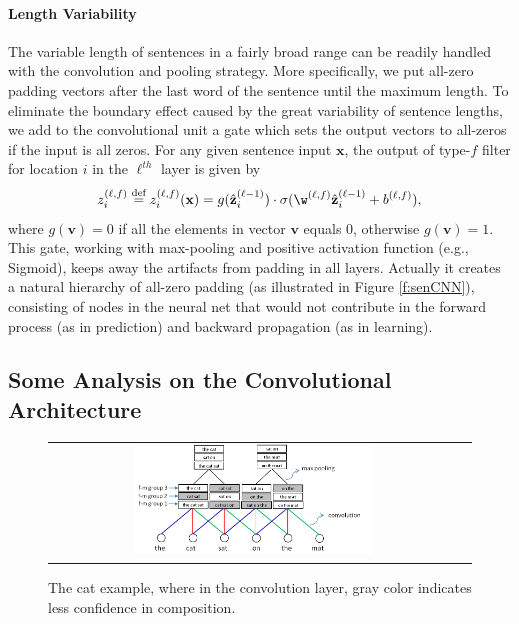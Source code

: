 \documentclass{article} %
\begin{document}
\paragraph{Length Variability} The variable length of sentences in a fairly broad range can be readily handled with the convolution and pooling strategy. More specifically, we put all-zero padding vectors after the last word of the sentence until the maximum length. To eliminate the boundary effect caused by the great variability of sentence lengths, we add to the convolutional unit a gate which sets the output vectors to all-zeros if the input is all zeros. For any given sentence input $\mathbf{x}$, the output of type-$f$ filter for location $i$ in the  $\ell^{th}$ layer is given by
\begin{equation}
z^{(\ell, f)}_{i} \overset{\text{def}}{=}
z^{(\ell,f)}_{i}(\mathbf{x}) =  g(\hat{\mathbf{z}}^{(\ell-1)}_{i})\cdot \sigma(\w^{(\ell,f)} \hat{\mathbf{z}}^{(\ell-1)}_{i} + b^{(\ell,f)}),
\end{equation}
where $g(\mathbf{v}) = 0$ if all the elements in vector $\mathbf{v}$ equals 0, otherwise $g(\mathbf{v}) = 1$. This gate, working with max-pooling and positive activation function (e.g., Sigmoid), keeps away the artifacts from padding in all layers. Actually it creates a natural hierarchy of all-zero padding (as illustrated in Figure \ref{f:senCNN}), consisting of nodes in the neural net that would not contribute in the forward process (as in prediction) and backward propagation (as in learning).


\subsection{Some Analysis on the Convolutional Architecture} \label{s:someAnalysis} \vspace{-10pt}
\begin{figure}
\begin{center}
\vspace{-5pt}
    \begin{tabular}[c]{cc}
     \includegraphics[width=0.6\textwidth]{pics/catExample.png}
     \end{tabular}
\vspace{-10pt}
    \caption{The cat example, where in the convolution layer, gray color indicates less confidence in composition.} \vspace{-5pt}
    \label{f:cat}
  \end{center}
\end{figure}
\end{document}

